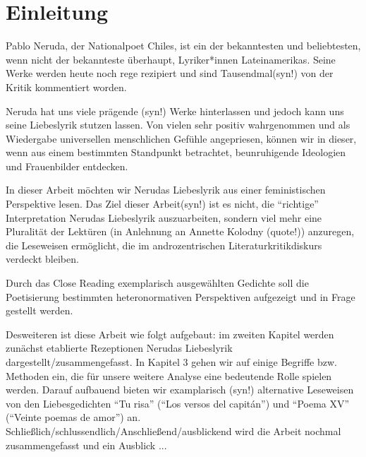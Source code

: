 \section{Einleitung}

Pablo Neruda, der Nationalpoet Chiles, ist ein der bekanntesten und beliebtesten, wenn nicht der bekannteste überhaupt, Lyriker*innen Lateinamerikas.
Seine Werke werden heute noch rege rezipiert und sind Tausendmal(syn!) von der Kritik kommentiert worden.


Neruda hat uns viele prägende (syn!) Werke hinterlassen und jedoch kann uns seine Liebeslyrik stutzen lassen.
Von vielen sehr positiv wahrgenommen und als Wiedergabe universellen menschlichen Gefühle angepriesen, können wir in dieser, wenn aus einem bestimmten Standpunkt betrachtet, beunruhigende Ideologien und Frauenbilder entdecken.

In dieser Arbeit möchten wir Nerudas Liebeslyrik aus einer feministischen Perspektive lesen.
Das Ziel dieser Arbeit(syn!) ist es nicht, die ``richtige'' Interpretation Nerudas Liebeslyrik auszuarbeiten, sondern viel mehr eine Pluralität der Lektüren (in Anlehnung an Annette Kolodny (quote!)) anzuregen, die Leseweisen ermöglicht, die im androzentrischen Literaturkritikdiskurs verdeckt bleiben.


\begin{comment}
  * literatur/sprache shape our minds
  * wachsamkeit/Sensibilität schaffen fürs Erkennen patriarchalischen Projekte, die mittels "universelle Gefühle", "schöne Liebeslyrik" vermittelt werden/dafür verkauft werden

  immer noch zu schwammig..
\end{comment}


Durch das Close Reading exemplarisch ausgewählten Gedichte soll die Poetisierung bestimmten heteronormativen Perspektiven aufgezeigt und in Frage gestellt werden.

Desweiteren ist diese Arbeit wie folgt aufgebaut: im zweiten Kapitel werden zunächst etablierte Rezeptionen Nerudas Liebeslyrik dargestellt/zusammengefasst.
In Kapitel 3 gehen wir auf einige Begriffe bzw. Methoden ein, die für unsere weitere Analyse eine bedeutende Rolle spielen werden.
Darauf aufbauend bieten wir examplarisch (syn!) alternative Leseweisen von den Liebesgedichten ``Tu risa'' (``Los versos del capitán'') und ``Poema XV'' (``Veinte poemas de amor'') an.
Schließlich/schlussendlich/Anschließend/ausblickend wird die Arbeit nochmal zusammengefasst und ein Ausblick ...

